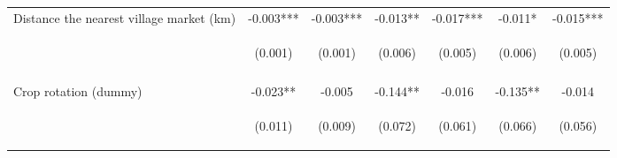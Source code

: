 \begin{center}
\begin{tabular}{lcccccc}
Distance the nearest village market (km) & -0.003*** & -0.003*** & -0.013** & -0.017*** & -0.011* & -0.015*** \\
 & \begin{footnotesize}(0.001)\end{footnotesize} & \begin{footnotesize}(0.001)\end{footnotesize} & \begin{footnotesize}(0.006)\end{footnotesize} & \begin{footnotesize}(0.005)\end{footnotesize} & \begin{footnotesize}(0.006)\end{footnotesize} & \begin{footnotesize}(0.005)\end{footnotesize} \\
\vspace{4pt} & \begin{footnotesize}[0.003]\end{footnotesize} & \begin{footnotesize}[0.000]\end{footnotesize} & \begin{footnotesize}[0.046]\end{footnotesize} & \begin{footnotesize}[0.002]\end{footnotesize} & \begin{footnotesize}[0.056]\end{footnotesize} & \begin{footnotesize}[0.003]\end{footnotesize} \\
Crop rotation (dummy) & -0.023** & -0.005 & -0.144** & -0.016 & -0.135** & -0.014 \\
 & \begin{footnotesize}(0.011)\end{footnotesize} & \begin{footnotesize}(0.009)\end{footnotesize} & \begin{footnotesize}(0.072)\end{footnotesize} & \begin{footnotesize}(0.061)\end{footnotesize} & \begin{footnotesize}(0.066)\end{footnotesize} & \begin{footnotesize}(0.056)\end{footnotesize} \\

\end{tabular}
\end{center}
